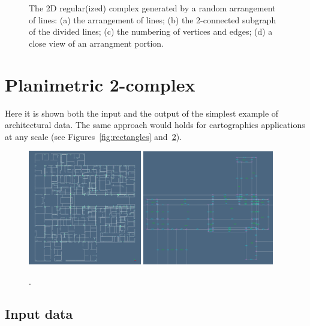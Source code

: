 \documentclass[11pt, oneside]{article}   	%
\begin{document}
\begin{figure}[htbp]
   \caption{The 2D regular(ized) complex generated by a random arrangement of lines:
   (a) the arrangement of lines; (b) the 2-connected subgraph of the divided lines; (c) the numbering of vertices and edges; (d) a close view of an arrangment portion. }
   \label{fig:2Dcells}
\end{figure}


\section{Planimetric 2-complex}

Here it is shown both the input and the output of the simplest example of architectural data. The same approach would holds for cartographics applications at any scale (see Figures~\ref{fig:rectangles} and~\ref{fig:testWall}).

\begin{figure}[htbp] %
   \centering
   \includegraphics[width=0.44\textwidth]{testWall1} 
   \includegraphics[width=0.51\textwidth]{testWall2} 
   \caption{.}
   \label{fig:testWall}
\end{figure}

\subsection{Input data}
\end{document}
